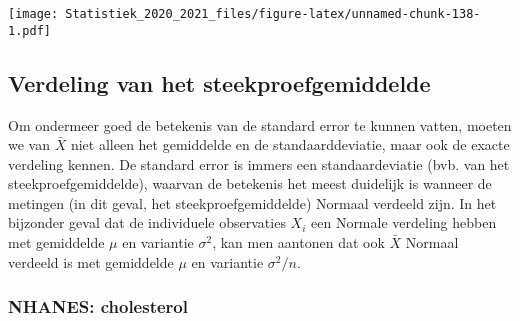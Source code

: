 \documentclass[
  12pt,dutch,coursenotes]{book}
\newenvironment{Shaded}{\begin{snugshade}}{\end{snugshade}}
\newcommand{\DataTypeTok}[1]{\textcolor[rgb]{0.13,0.29,0.53}{#1}}
\newcommand{\DecValTok}[1]{\textcolor[rgb]{0.00,0.00,0.81}{#1}}
\newcommand{\KeywordTok}[1]{\textcolor[rgb]{0.13,0.29,0.53}{\textbf{#1}}}
\newcommand{\NormalTok}[1]{#1}
\newcommand{\OperatorTok}[1]{\textcolor[rgb]{0.81,0.36,0.00}{\textbf{#1}}}
\newcommand{\StringTok}[1]{\textcolor[rgb]{0.31,0.60,0.02}{#1}}
\theoremstyle{definition}
\theoremstyle{definition}
\theoremstyle{definition}
\theoremstyle{remark}
\begin{document}
\begin{Shaded}
\end{Shaded}

\texttt{[image: Statistiek\_2020\_2021\_files/figure-latex/unnamed-chunk-138-1.pdf]}

\hypertarget{subsec:verdelingXbar}{%
\subsection{Verdeling van het steekproefgemiddelde}\label{subsec:verdelingXbar}}

Om ondermeer goed de betekenis van de standard error te kunnen vatten, moeten we van \(\bar X\) niet alleen het gemiddelde en de standaarddeviatie, maar ook de exacte verdeling kennen. De standard error is immers een standaardeviatie (bvb. van het steekproefgemiddelde), waarvan de betekenis het meest duidelijk is wanneer de metingen (in dit geval, het steekproefgemiddelde) Normaal verdeeld zijn.
In het bijzonder geval dat de
individuele observaties \(X_i\) een Normale verdeling hebben met gemiddelde \(\mu\) en variantie \(\sigma^2\), kan men aantonen dat ook \(\bar X\) Normaal verdeeld is met gemiddelde \(\mu\) en variantie \(\sigma^2/n.\)

\hypertarget{nhanes-cholesterol}{%
\subsubsection{NHANES: cholesterol}\label{nhanes-cholesterol}}
\end{document}
